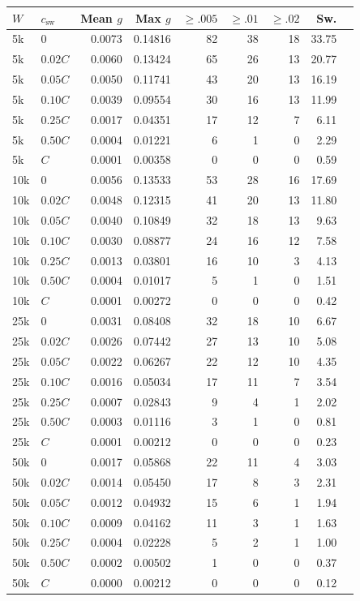\begin{tabular}{llrrrrrrr}
\toprule
$W$ & $c_{\text{sw}}$ & Mean $g$ & Max $g$ & $\ge .005$ & $\ge .01$ & $\ge .02$ & Sw. \\
\midrule
5k & $0$ & 0.0073 & 0.14816 & 82 & 38 & 18 & 33.75 \\
5k & $0.02C$ & 0.0060 & 0.13424 & 65 & 26 & 13 & 20.77 \\
5k & $0.05C$ & 0.0050 & 0.11741 & 43 & 20 & 13 & 16.19 \\
5k & $0.10C$ & 0.0039 & 0.09554 & 30 & 16 & 13 & 11.99 \\
5k & $0.25C$ & 0.0017 & 0.04351 & 17 & 12 & 7 & 6.11 \\
5k & $0.50C$ & 0.0004 & 0.01221 & 6 & 1 & 0 & 2.29 \\
5k & $C$ & 0.0001 & 0.00358 & 0 & 0 & 0 & 0.59 \\
\midrule
10k & $0$ & 0.0056 & 0.13533 & 53 & 28 & 16 & 17.69 \\
10k & $0.02C$ & 0.0048 & 0.12315 & 41 & 20 & 13 & 11.80 \\
10k & $0.05C$ & 0.0040 & 0.10849 & 32 & 18 & 13 & 9.63 \\
10k & $0.10C$ & 0.0030 & 0.08877 & 24 & 16 & 12 & 7.58 \\
10k & $0.25C$ & 0.0013 & 0.03801 & 16 & 10 & 3 & 4.13 \\
10k & $0.50C$ & 0.0004 & 0.01017 & 5 & 1 & 0 & 1.51 \\
10k & $C$ & 0.0001 & 0.00272 & 0 & 0 & 0 & 0.42 \\
\midrule
25k & $0$ & 0.0031 & 0.08408 & 32 & 18 & 10 & 6.67 \\
25k & $0.02C$ & 0.0026 & 0.07442 & 27 & 13 & 10 & 5.08 \\
25k & $0.05C$ & 0.0022 & 0.06267 & 22 & 12 & 10 & 4.35 \\
25k & $0.10C$ & 0.0016 & 0.05034 & 17 & 11 & 7 & 3.54 \\
25k & $0.25C$ & 0.0007 & 0.02843 & 9 & 4 & 1 & 2.02 \\
25k & $0.50C$ & 0.0003 & 0.01116 & 3 & 1 & 0 & 0.81 \\
25k & $C$ & 0.0001 & 0.00212 & 0 & 0 & 0 & 0.23 \\
\midrule
50k & $0$ & 0.0017 & 0.05868 & 22 & 11 & 4 & 3.03 \\
50k & $0.02C$ & 0.0014 & 0.05450 & 17 & 8 & 3 & 2.31 \\
50k & $0.05C$ & 0.0012 & 0.04932 & 15 & 6 & 1 & 1.94 \\
50k & $0.10C$ & 0.0009 & 0.04162 & 11 & 3 & 1 & 1.63 \\
50k & $0.25C$ & 0.0004 & 0.02228 & 5 & 2 & 1 & 1.00 \\
50k & $0.50C$ & 0.0002 & 0.00502 & 1 & 0 & 0 & 0.37 \\
50k & $C$ & 0.0000 & 0.00212 & 0 & 0 & 0 & 0.12 \\
\bottomrule
\end{tabular}
